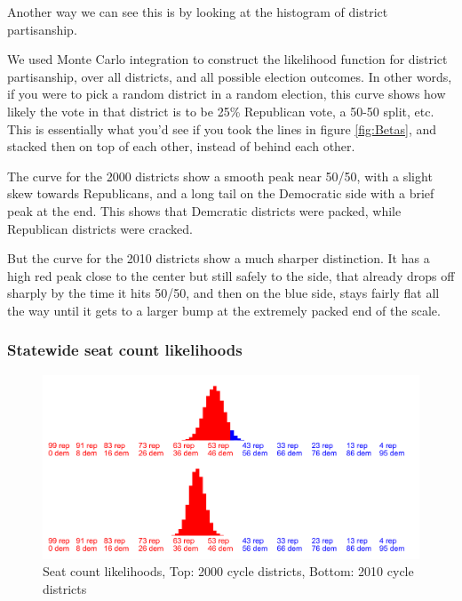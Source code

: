 \documentclass[preprint,12pt]{article}
\begin{document}
Another way we can see this is by looking at the histogram of district partisanship.
 
We used Monte Carlo integration to construct the likelihood function for district partisanship, over all districts, and all possible election outcomes.
In other words, if you were to pick a random district in a random election, this curve shows how likely the vote in that district is to be 25\% Republican vote, a 50-50 split, etc.
This is essentially what you'd see if you took the lines in figure \ref{fig:Betas}, and stacked then on top of each other, instead of behind each other. 
 
The curve for the 2000 districts show a smooth peak near 50/50, with a slight skew towards Republicans, and a long tail on the Democratic side with a brief peak at the end.  This shows that Demcratic districts were packed, while Republican districts were cracked.

But the curve for the 2010 districts show a much sharper distinction.
It has a high red peak close to the center but still safely to the side, that already drops off sharply by the time it hits 50/50, and then on the blue side, stays fairly flat all the way until it gets to a larger bump at the extremely packed end of the scale.


\subsubsection{Statewide seat count likelihoods}

\begin{figure}[htb!]
    \begin{center}
        \includegraphics[scale=0.25]{../Figures/WI_compared/seats_cropped.png}
        \caption{Seat count likelihoods, Top: 2000 cycle districts, Bottom: 2010 cycle districts}\label{fig:LikelihoodsSeatCounts}
    \end{center}
\end{figure}
 
\end{document}
